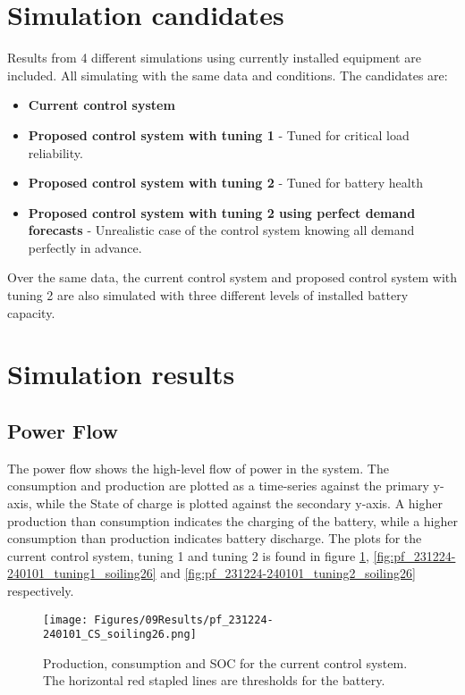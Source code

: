 \section{Simulation candidates}
Results from 4 different simulations using currently installed equipment are included. All simulating with the same data and conditions. The candidates are:
\begin{itemize}
    \item \textbf{Current control system}
    \item \textbf{Proposed control system with tuning 1} - Tuned for critical load reliability.
    \item \textbf{Proposed control system with tuning 2} - Tuned for battery health
    \item \textbf{Proposed control system with tuning 2 using perfect demand forecasts} - Unrealistic case of the control system knowing all demand perfectly in advance.
\end{itemize}

Over the same data, the current control system and proposed control system with tuning 2 are also simulated with three different levels of installed battery capacity.

\section{Simulation results}
\subsection{Power Flow}

The power flow shows the high-level flow of power in the system. The consumption and production are plotted as a time-series against the primary y-axis, while the State of charge is plotted against the secondary y-axis. A higher production than consumption indicates the charging of the battery, while a higher consumption than production indicates battery discharge. The plots for the current control system, tuning 1 and tuning 2 is found in figure \ref{fig:pf_231224-240101_CS_soiling26}, \ref{fig:pf_231224-240101_tuning1_soiling26} and \ref{fig:pf_231224-240101_tuning2_soiling26} respectively. 

\begin{figure}[h]
    \centering
    \texttt{[image: Figures/09Results/pf\_231224-240101\_CS\_soiling26.png]}
    \caption[Power flow current control system]{Production, consumption and SOC for the current control system. The horizontal red stapled lines are thresholds for the battery. }
    \label{fig:pf_231224-240101_CS_soiling26}
\end{figure}

